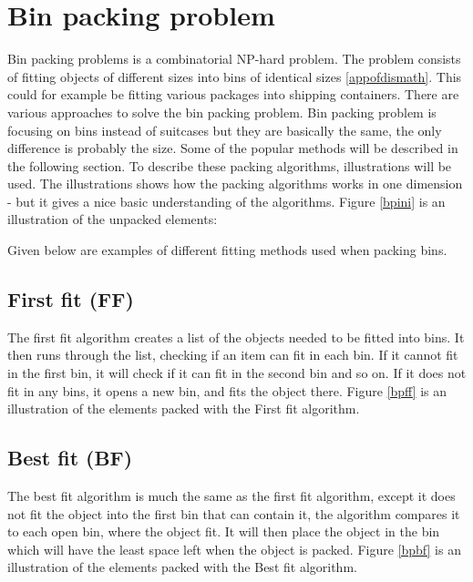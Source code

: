 \section{Bin packing problem}
\label{sec:binpacking}
Bin packing problems is a combinatorial NP-hard problem. The problem consists of fitting objects of different sizes into bins of identical sizes \ref{appofdismath}. This could for example be fitting various packages into shipping containers. There are various approaches to solve the bin packing problem. Bin packing problem is focusing on bins instead of suitcases but they are basically the same, the only difference is probably the size. Some of the popular methods will be described in the following section. To describe these packing algorithms, illustrations will be used. The illustrations shows how the packing algorithms works in one dimension - but it gives a nice basic understanding of the algorithms. Figure \ref{bpini} is an illustration of the unpacked elements:

Given below are examples of different fitting methods used when packing bins.

\subsection{First fit (FF)}
The first fit algorithm creates a list of the objects needed to be fitted into bins. It then runs through the list, checking if an item can fit in each bin. If it cannot fit in the first bin, it will check if it can fit in the second bin and so on. If it does not fit in any bins, it opens a new bin, and fits the object there. Figure \ref{bpff} is an illustration of the elements packed with the First fit algorithm.


\subsection{Best fit (BF)}
The best fit algorithm is much the same as the first fit algorithm, except it does not fit the object into the first bin that can contain it, the algorithm compares it to each open bin, where the object fit. It will then place the object in the bin which will have the least space left when the object is packed. Figure \ref{bpbf} is an illustration of the elements packed with the Best fit algorithm.

